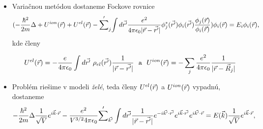 \documentclass[
	11pt, %
]{beamer}
\begin{document}
\begin{frame}
\begin{itemize}

\item Variačnou metódou dostaneme Fockove rovnice
\tiny
\begin{equation}
\label{eq:fock3}
(-\frac{\hbar^2}{2m}\Delta +U^{ion}(\vec{r})+U^{el}(\vec{r})-
{\sum'}_j{\int d\vec{r'}\frac{e^2}{4\pi \epsilon_0|\vec{r}-\vec{r'}|}
\phi_j^{*}(\vec{r'})\phi_i(\vec{r'})\frac{\phi_j(\vec{r})}{\phi_i(\vec{r})}})\phi_i({\vec{r}})=E_i\phi_i(\vec{r}) \text{,}
\end{equation}
\normalsize
kde členy

\begin{equation}
\label{eq:hartree a ion}
U^{el}(\vec{r}) = -\frac{e}{4\pi \epsilon_0} \int d\vec{r'}\ \rho_{el}(\vec{r'}) \frac {1}{|\vec{r}-\vec{r'}|} \ \  \text{a} \ \  U^{ion}(\vec{r}) = -\sum_j\frac{e^2}{4\pi \epsilon_0}{\frac{1}{|\vec{r}-\vec{R}_j|}}
\end{equation}
\normalsize
\item Problém riešime v modeli \emph{želé}, teda členy $U^{el}(\vec{r})$ a $U^{ion}(\vec{r})$ vypadnú, dostaneme
\small
\begin{equation}
\label{eq:fock_final}
-\frac{\hbar^2}{2m}\Delta \frac{1}{\sqrt V}e^{i\vec{k}\cdot\vec{r}}-\frac{e^2}{V^{3/2}4\pi\epsilon_0}{\sum'}_{\vec{k'}}\int d\vec{r'} \frac{1}{|\vec{r}-\vec{r'}|} e^{-i\vec{k'} \cdot \vec{r'} }e^{i\vec{k} \cdot \vec{r'}}e^{i\vec{k'} \cdot \vec{r}}=E(\vec{k})\frac{1}{\sqrt V}e^{i\vec{k} \cdot \vec{r}} \text{,}
\end{equation}
\normalsize
\end{itemize}
\end{frame}
\end{document}

